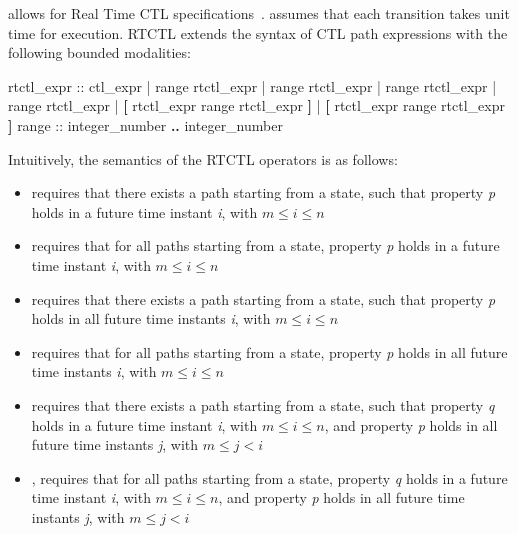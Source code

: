 \nusmv allows for Real Time CTL specifications~\cite{EMSS91}.
%
\nusmv assumes that each transition takes unit time for
execution. 
%
RTCTL extends the syntax of CTL path expressions with the following
bounded modalities:
%
\begin{Grammar}
rtctl_expr ::
        ctl_expr
      |  range rtctl_expr
      |  range rtctl_expr
      |  range rtctl_expr
      |  range rtctl_expr
      |  \textbf{[} rtctl_expr  range rtctl_expr \textbf{]}
      |  \textbf{[} rtctl_expr  range rtctl_expr \textbf{]}
range  :: integer_number \textbf{..} integer_number
\end{Grammar}
%
Intuitively, the semantics of the RTCTL operators is as follows:\\
%
\begin{itemize}
  \item {}
        requires that there exists a path starting from a state, such
        that property \textit{p} holds in a future time instant
        \textit{i}, with $m \leq i \leq n$
  \item {}
        requires that for all paths starting from a state, property
        \textit{p} holds in a future time instant \textit{i}, with $m
        \leq i \leq n$
  \item {}
        requires that there exists a path starting from a state, such
        that property \textit{p} holds in all future time instants
        \textit{i}, with $m \leq i \leq n$
  \item {}
        requires that for all paths starting from a state, property
        \textit{p} holds in all future time instants \textit{i}, with
        $m \leq i \leq n$
  \item {}
        requires that there exists a path starting from a state, such
        that property \textit{q} holds in a future time instant
        \textit{i}, with $m \leq i \leq n$, and property \textit{p}
        holds in all future time instants \textit{j}, with $m \leq j <
        i$
  \item {},
        requires that for all paths starting from a state, property
        \textit{q} holds in a future time instant \textit{i}, with $m
        \leq i \leq n$, and property \textit{p} holds in all future
        time instants \textit{j}, with $m \leq j < i$
\end{itemize}
